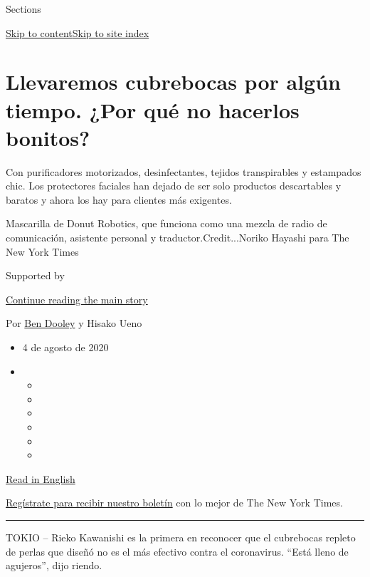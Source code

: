 Sections

\protect\hyperlink{site-content}{Skip to
content}\protect\hyperlink{site-index}{Skip to site index}

\hypertarget{llevaremos-cubrebocas-por-alguxfan-tiempo-por-quuxe9-no-hacerlos-bonitos}{%
\section{Llevaremos cubrebocas por algún tiempo. ¿Por qué no hacerlos
bonitos?}\label{llevaremos-cubrebocas-por-alguxfan-tiempo-por-quuxe9-no-hacerlos-bonitos}}

Con purificadores motorizados, desinfectantes, tejidos transpirables y
estampados chic. Los protectores faciales han dejado de ser solo
productos descartables y baratos y ahora los hay para clientes más
exigentes.

Mascarilla de Donut Robotics, que funciona como una mezcla de radio de
comunicación, asistente personal y traductor.Credit...Noriko Hayashi
para The New York Times

Supported by

\protect\hyperlink{after-sponsor}{Continue reading the main story}

Por \href{https://www.nytimes3xbfgragh.onion/by/ben-dooley}{Ben Dooley}
y Hisako Ueno

\begin{itemize}
\item
  4 de agosto de 2020
\item
  \begin{itemize}
  \item
  \item
  \item
  \item
  \item
  \item
  \end{itemize}
\end{itemize}

\href{https://www.nytimes3xbfgragh.onion/2020/07/27/business/fashion-masks-coronavirus.html}{Read
in English}

\href{https://www.nytimes3xbfgragh.onion/newsletters/el-times}{Regístrate
para recibir nuestro boletín} con lo mejor de The New York Times.

\begin{center}\rule{0.5\linewidth}{\linethickness}\end{center}

TOKIO -- Rieko Kawanishi es la primera en reconocer que el cubrebocas
repleto de perlas que diseñó no es el más efectivo contra el
coronavirus. ``Está lleno de agujeros'', dijo riendo.

